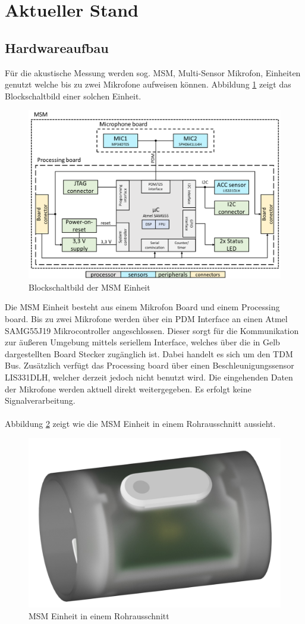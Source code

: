 
\section{Aktueller Stand}
\subsection{Hardwareaufbau}

Für die akustische Messung werden sog. MSM, Multi-Sensor Mikrofon, Einheiten genutzt welche bis zu zwei Mikrofone aufweisen können. Abbildung \ref{fig:msmblockdiagram} zeigt das Blockschaltbild einer solchen Einheit.

\begin{figure}[H]
	\centering
	\includegraphics[width=0.7\linewidth]{images/MSM_block_diagram}
	\caption{Blockschaltbild der MSM Einheit}
	\label{fig:msmblockdiagram}
\end{figure}

Die MSM Einheit besteht aus einem Mikrofon Board und einem \glqq Processing board\grqq. Bis zu zwei Mikrofone werden über ein PDM Interface an einen Atmel SAMG55J19 Mikrocontroller angeschlossen. Dieser sorgt für die Kommunikation zur äußeren Umgebung mittels seriellem Interface, welches über die in Gelb dargestellten Board Stecker zugänglich ist. Dabei handelt es sich um den TDM Bus. Zusätzlich verfügt das Processing board über einen Beschleunigungssensor LIS331DLH, welcher derzeit jedoch nicht benutzt wird. Die eingehenden Daten der Mikrofone werden aktuell direkt weitergegeben. Es erfolgt keine Signalverarbeitung.\\
\\
Abbildung \ref{fig:microphone} zeigt wie die MSM Einheit in einem Rohrausschnitt aussieht.

\begin{figure}[H]
	\centering
	\includegraphics[width=0.4\linewidth]{images/microphone}
	\caption{MSM Einheit in einem Rohrausschnitt}
	\label{fig:microphone}
\end{figure}

